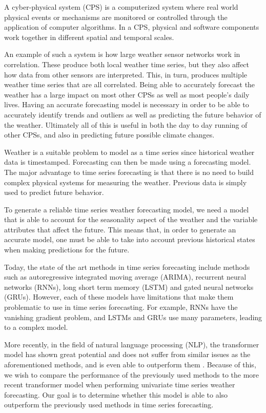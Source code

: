 \label{sec:intro}
A cyber-physical system (CPS) is a computerized system where real world physical events or mechanisms are monitored or controlled through the application of computer algorithms.
In a CPS, physical and software components work together in different spatial and temporal scales.

An example of such a system is how large weather sensor networks work in correlation. These produce both local weather time series, but they also affect how data from other sensors are interpreted. This, in turn, produces multiple weather time series that are all correlated. Being able to accurately forecast the weather has a large impact on most other CPSs as well as most people's daily lives. Having an accurate forecasting model is necessary in order to be able to accurately identify trends and outliers as well as predicting the future behavior of the weather. Ultimately all of this is useful in both the day to day running of other CPSs, and also in predicting future possible climate changes. 

Weather is a suitable problem to model as a time series since historical weather data is timestamped.
Forecasting can then be made using a forecasting model.
The major advantage to time series forecasting is that there is no need to build complex physical systems for measuring the weather. 
Previous data is simply used to predict future behavior.

To generate a reliable time series weather forecasting model, we need a model that is able to account for the seasonality aspect of the weather and the variable attributes that affect the future. 
This means that, in order to generate an accurate model, one must be able to take into account previous historical states when making predictions for the future. 

Today, the state of the art methods in time series forecasting include methods such as autoregressive integrated moving average (ARIMA), recurrent neural networks (RNNs), long short term memory (LSTM) and gated neural networks
(GRUs).
However, each of these models have limitations that make them problematic to use in time series forecasting.
For example, RNNs have the vanishing gradient problem, and LSTMs and GRUs use many parameters, leading to a complex model.

More recently, in the field of natural language processing (NLP), the transformer model has shown great potential and does not suffer from similar issues as the aforementioned methods, and is even able to outperform them \cite{AttentionIsAllYouNeed}.
Because of this, we wish to compare the performance of the previously used methods to the more recent transformer model when performing univariate time series weather forecasting. Our goal is to determine whether this model is able to also outperform the previously used methods in time series forecasting.

